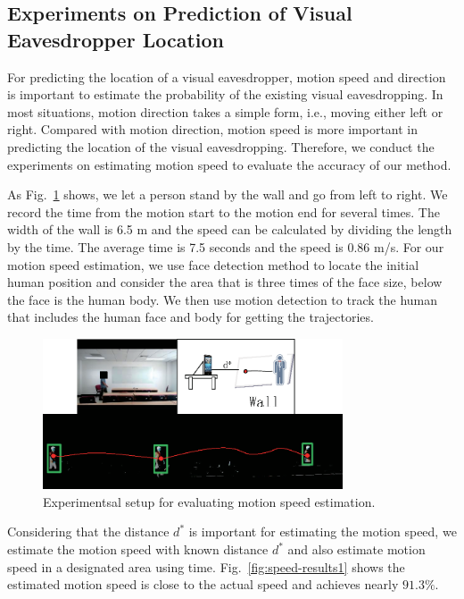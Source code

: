 \subsection{Experiments on Prediction of Visual Eavesdropper Location }


For predicting the location of a visual eavesdropper,  motion speed and direction is important to estimate the probability of the existing visual eavesdropping. In most situations,  motion direction takes a simple form, i.e., moving either left or right. Compared with  motion direction,  motion speed is more important in predicting the location of the visual eavesdropping. Therefore, we conduct the experiments on estimating motion speed to evaluate the accuracy of our method.

As Fig.~\ref{fig:speed-exp} shows, we let a person stand by the wall and go from  left  to  right. We record the time from the motion start to the motion end for several times. The width of the wall is 6.5 m and the speed can be calculated by dividing the length by the time. The average time is 7.5 seconds and the speed is 0.86 m/s. For our motion speed estimation, we use face detection method to locate the initial human position and consider the area that is three times of the face size,  below the face is the human body. We then use motion detection to track the human that includes the human face and body for getting the trajectories.

\begin{figure}[H]
\centering
\includegraphics[width=3.5in]{epsmotion.eps}
\caption{Experimentsal setup for evaluating motion speed estimation. }
\label{fig:speed-exp}
\end{figure}
Considering that the distance $d^*$ is important for estimating the motion speed, we estimate the motion speed with known distance $d^*$ and also estimate motion speed in a designated area using time.
Fig.~\ref{fig:speed-results1} shows the estimated motion speed is close to the actual speed and achieves nearly $91.3\%$.




